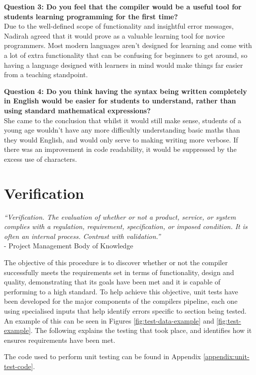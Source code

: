 \documentclass[
]{report}
\begin{document}
\textbf{Question 3: Do you feel that the compiler would be a useful tool
for students learning programming for the first time?}\\
Due to the well-defined scope of functionality and insightful error
messages, Nadirah agreed that it would prove as a valuable learning tool
for novice programmers. Most modern languages aren't designed for
learning and come with a lot of extra functionality that can be
confusing for beginners to get around, so having a language designed
with learners in mind would make things far easier from a teaching
standpoint.

\textbf{Question 4: Do you think having the syntax being written
completely in English would be easier for students to understand, rather
than using standard mathematical \glspl{expression}?}\\
She came to the conclusion that whilst it would still make sense,
students of a young age wouldn't have any more difficultly understanding
basic maths than they would English, and would only serve to making
writing more verbose. If there was an improvement in code readability,
it would be suppressed by the excess use of characters.

\section{Verification}
\emph{``Verification. The evaluation of whether or not a product, service, or
system complies with a regulation, requirement, specification, or
imposed condition. It is often an internal process. Contrast with
validation.''}\\
- Project Management Body of Knowledge \cite{pmbok-book}

The objective of this procedure is to discover whether or not the
compiler successfully meets the requirements set in terms of
functionality, design and quality, demonstrating that its goals have
been met and it is capable of performing to a high standard. To help
achieve this objective, unit tests have been developed for the major
components of the compilers pipeline, each one using specialised inputs
that help identify errors specific to section being tested. An example of
this can be seen in Figures \ref{fig:test-data-example} and \ref{fig:test-example}.
The following explains the testing that took place, and identifies how it
ensures requirements have been met.

The code used to perform unit testing can be found in Appendix \ref{appendix:unit-test-code}.
\end{document}
